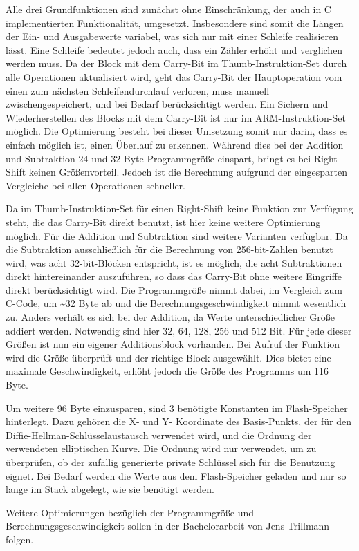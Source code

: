 Alle drei Grundfunktionen sind zunächst ohne Einschränkung, der auch in C implementierten Funktionalität, umgesetzt. Insbesondere sind somit
die Längen der Ein- und Ausgabewerte variabel, was sich nur mit einer Schleife realisieren lässt. Eine Schleife bedeutet jedoch auch, dass
ein Zähler erhöht und verglichen werden muss. Da der Block mit dem Carry-Bit im Thumb-Instruktion-Set durch alle Operationen aktualisiert wird,
geht das Carry-Bit der Hauptoperation vom einen zum nächsten Schleifendurchlauf verloren, muss manuell zwischengespeichert, und bei Bedarf
berücksichtigt werden. Ein Sichern und Wiederherstellen des Blocks mit dem Carry-Bit ist nur im ARM-Instruktion-Set möglich.
Die Optimierung besteht bei dieser Umsetzung somit nur darin, dass es einfach möglich ist, einen Überlauf zu erkennen.
Während dies bei der Addition und Subtraktion 24 und 32 Byte Programmgröße einspart, bringt es bei Right-Shift
keinen Größenvorteil. Jedoch ist die Berechnung aufgrund der eingesparten Vergleiche bei allen Operationen schneller.

Da im Thumb-Instruktion-Set für einen Right-Shift keine Funktion zur Verfügung steht, die das Carry-Bit direkt benutzt, ist hier keine weitere Optimierung möglich.
Für die Addition und Subtraktion sind weitere Varianten verfügbar. Da die Subtraktion ausschließlich für die Berechnung von 256-bit-Zahlen benutzt wird,
was acht 32-bit-Blöcken entspricht, ist es möglich, die acht Subtraktionen direkt hintereinander auszuführen, so dass das Carry-Bit ohne weitere
Eingriffe direkt berücksichtigt wird. Die Programmgröße nimmt dabei, im Vergleich zum C-Code, um \textasciitilde 32 Byte ab und die
Berechnungsgeschwindigkeit nimmt wesentlich zu. Anders verhält es sich bei der Addition, da Werte unterschiedlicher Größe addiert werden.
Notwendig sind hier 32, 64, 128, 256 und 512 Bit. Für jede dieser Größen ist nun ein eigener Additionsblock vorhanden. Bei Aufruf der Funktion wird
die Größe überprüft und der richtige Block ausgewählt. Dies bietet eine maximale Geschwindigkeit, erhöht jedoch die Größe des Programms um 116 Byte.

Um weitere 96 Byte einzusparen, sind 3 benötigte Konstanten im Flash-Speicher hinterlegt. Dazu gehören die X- und Y- Koordinate des Basis-Punkts, der für
den Diffie-Hellman-Schlüsselaustausch verwendet wird, und die Ordnung der verwendeten elliptischen Kurve. Die Ordnung wird nur verwendet, um zu überprüfen,
ob der zufällig generierte private Schlüssel sich für die Benutzung eignet. Bei Bedarf werden die Werte aus dem Flash-Speicher geladen und nur so lange
im Stack abgelegt, wie sie benötigt werden.

Weitere Optimierungen bezüglich der Programmgröße und Berechnungsgeschwindigkeit sollen in der Bachelorarbeit von Jens Trillmann folgen.